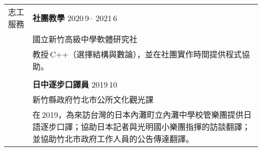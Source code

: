 \documentclass[letterpaper, 11pt]{article}
\newcommand{\ms}{\,}
\begin{document}
\begin{CJK*}{UTF8}{bkai}
\begin{center}
\begin{longtable}{p{0.72in}p{5.97in}}

        {\textcolor{OliveGreen}{志工服務}} & \textbf{社團教學} \hfill 2020\ms9 -- 2021\ms6 \\
        & 國立新竹高級中學軟體研究社\\
        & 教授\ms C++（選擇結構與數論），並在社團實作時間提供程式協助。\\
        & \\

        & \textbf{日中逐步口譯員} \hfill 2019\ms10 \\
        & 新竹縣政府竹北市公所文化觀光課\\
        & 在\ms2019，為來訪台灣的日本內灘町立內灘中學校管樂團提供日語逐步口譯；協助日本記者與光明國小樂團指揮的訪談翻譯；並協助竹北市政府工作人員的公告傳達翻譯。
        
        
        
        
    \end{longtable}
\end{center}

\end{CJK*}
\end{document}
